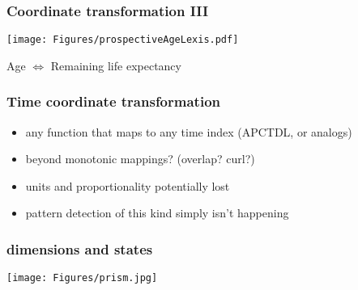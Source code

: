 \documentclass[20pt]{beamer}
\begin{document}

\begin{frame}
\frametitle{Coordinate transformation III}
\vspace{-4em}
\begin{center}
\texttt{[image: Figures/prospectiveAgeLexis.pdf]}
\end{center}
Age $\Leftrightarrow$ Remaining life expectancy 
\end{frame}


\begin{frame}
\frametitle{Time coordinate transformation}
\begin{itemize}[<+->]
  \item any function that maps to any time index (APCTDL, or analogs)
  \item beyond monotonic mappings? (overlap? curl?)
  \item units and proportionality potentially lost
  \item pattern detection of this kind simply isn't happening
\end{itemize}
\end{frame}


\begin{frame}
\frametitle{dimensions and states}
\vspace{-10em}
\begin{center}
\hspace*{-6cm}\texttt{[image: Figures/prism.jpg]}
\end{center}
\end{frame}

\end{document}
